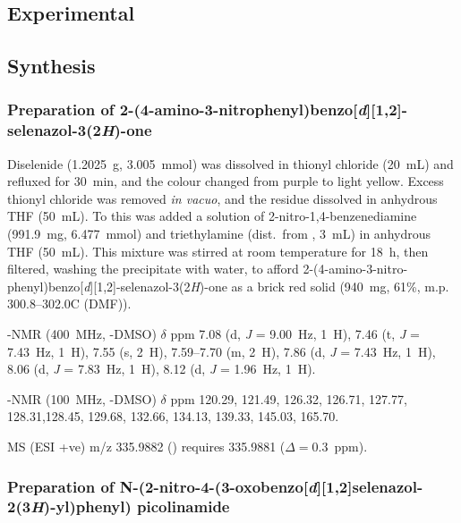 \begin{refsection}
    \section{Experimental}
    \subsection{Synthesis}
    \subsubsection[Preparation of \refcmpd{ebs-nitroaniline}]{Preparation of 2-(4-amino-3-nitrophenyl)benzo[\emph{d}][1,2]-selenazol-3(2\emph{H})-one }
    
    Diselenide  (1.2025~g, 3.005~mmol) was dissolved in thionyl chloride (20~mL) and refluxed for 30~min, and the colour changed from purple to light yellow.
    Excess thionyl chloride was removed \emph{in vacuo}, and the residue dissolved in anhydrous THF (50~mL).
    To this was added a solution of 2-nitro-1,4-benzenediamine (991.9~mg, 6.477~mmol) and triethylamine (dist.\ from , 3~mL) in anhydrous THF (50~mL).
    This mixture was stirred at room temperature for 18~h, then filtered, washing the precipitate with water, to afford 2-(4-amino-3-nitro-phenyl)benzo[\emph{d}][1,2]-selenazol-3(2\emph{H})-one  as a brick red solid (940~mg, 61\%, m.p. 300.8--302.0\degree{}C (DMF)).

    -NMR (400~MHz, -DMSO) $\delta$ ppm
    7.08 (d, \emph{J} = 9.00~Hz, 1~H), 7.46 (t, \emph{J} = 7.43~Hz, 1~H), 7.55 (s, 2~H), 7.59--7.70 (m, 2~H), 7.86 (d, \emph{J} = 7.43~Hz, 1~H), 8.06 (d, \emph{J} = 7.83~Hz, 1~H), 8.12 (d, \emph{J} = 1.96~Hz, 1~H).
    
    -NMR (100~MHz, -DMSO) $\delta$ ppm
    120.29, 121.49, 126.32, 126.71, 127.77, 128.31,128.45, 129.68, 132.66, 134.13, 139.33, 145.03, 165.70.
    
    MS (ESI +ve) m/z 335.9882 ()  requires 335.9881 ($\Delta=0.3$~ppm).
    
    \subsubsection[Preparation of \refcmpd{ebs-nitroamide-2py}]{Preparation of N-(2-nitro-4-(3-oxobenzo[\emph{d}][1,2]selenazol-2(3\emph{H})-yl)\-phen\-yl) picolinamide }
    

\end{refsection}
